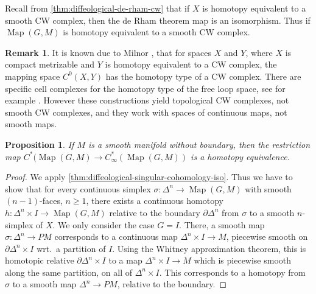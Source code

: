 \documentclass{scrartcl}
\theoremstyle{plain}
\newtheorem{proposition}[theorem]{Proposition}
\theoremstyle{definition}
\newtheorem{remark}[theorem]{Remark}
\DeclareMathOperator{\Map}{Map}
\begin{document}
Recall from \cref{thm:diffeological-de-rham-cw} that if $X$ is homotopy equivalent to a smooth CW complex, then the de Rham theorem map is an isomorphism. Thus if $\Map(G, M)$ is homotopy equivalent to a smooth CW complex.

\begin{remark}
    It is known due to Milnor \cite{milnor1959spaces}, that for spaces $X$ and $Y$, where $X$ is compact metrizable and $Y$ is homotopy equivalent to a CW complex, the mapping space $C^0(X, Y)$ has the homotopy type of a CW complex. There are specific cell complexes for the homotopy type of the free loop space, see for example \cite{rivera2018combinatorial}. However these constructions yield topological CW complexes, not smooth CW complexes, and they work with spaces of continuous maps, not smooth maps.
\end{remark}


\begin{proposition}\label{prop:comparison-singular-smooth-cohomology}
    If $M$ is a smooth manifold without boundary, then the restriction map $C^*(\Map(G, M) \to C_\infty^*(\Map(G, M))$ is a homotopy equivalence.
\end{proposition}
\begin{proof}
    We apply \cref{thm:diffeological-singular-cohomology-iso}. Thus we have to show that for every continuous simplex $\sigma\colon \Delta^n\to \Map(G, M)$ with smooth $(n-1)$-faces, $n\geq 1$, there exists a continuous homotopy $h\colon \Delta^n\times I\to \Map(G, M)$ relative to the boundary $\partial\Delta^n$ from $\sigma$ to a smooth $n$-simplex of $X$. We only consider the case $G=I$. There, a smooth map $\sigma\colon\Delta^n\to PM$ corresponds to a continuous map $\Delta^n\times I\to M$, piecewise smooth on $\partial\Delta^n\times I$ wrt.\ a partition of $I$. Using the Whitney approximation theorem, this is homotopic relative $\partial\Delta^n\times I$ to a map $\Delta^n\times I\to M$ which is piecewise smooth along the same partition, on all of $\Delta^n\times I$. This corresponds to a homotopy from $\sigma$ to a smooth map $\Delta^n\to PM$, relative to the boundary. 
\end{proof}
\end{document}
